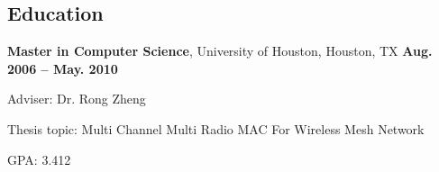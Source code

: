 \documentclass[overlapped, line]{resume}
\begin{document}
\address{mobile: 832 964 6883; e-mail: 1983.song.wei@gmail.com}
\begin{resume}



  \vspace{-10pt}\section{Education}
         {\bf Master in Computer Science}, University of Houston, Houston, TX \hfill {\bf Aug. 2006 -- May. 2010}\\
         \vspace{-10pt}      %
         \begin{list2}
         \item Adviser:  Dr. Rong Zheng
         \item Thesis topic:  Multi Channel Multi Radio MAC For Wireless Mesh Network
         \item GPA: 3.412
         \end{list2}  \vspace{-5pt}


\end{resume}
\end{document}
